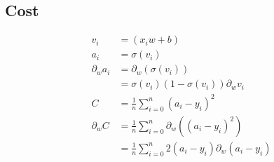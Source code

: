 \documentclass{article}
\begin{document}
\subsection{Cost}

\def\pd[#1]{\partial_{#1}}
\def\avgsum[#1,#2]{\frac{1}{#2}\sum_{#1=0}^{#2}}

\begin{align}
	v_i &= (x_i w + b) \\
	a_i &= \sigma(v_i) \\
	\pd[w] a_i 
		&= \pd[w](\sigma(v_i))\\
		&= \sigma(v_i)(1 - \sigma(v_i))\pd[w]v_i\\
	C &= \avgsum[i,n](a_i - y_i )^2 \\
	\pd[w] C
		&= \avgsum[i,n]\pd[w]\left((a_i - y_i)^2 \right) \\
		&= \avgsum[i,n]2\left(a_i - y_i \right) \pd[w]\left(a_i - y_i\right)\\
\end{align}
\end{document}
